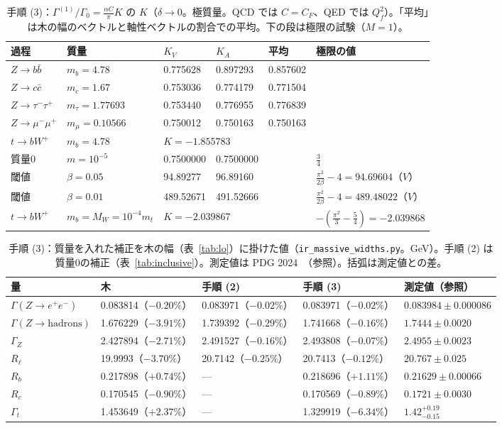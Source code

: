 \documentclass[a4paper,10pt]{ltjsarticle}
\begin{document}
\begin{table}[tbp]
\centering\small
\caption{手順 (3)：$\Gamma^{(1)}/\Gamma_0=\frac{\alpha C}\pi K$ の $K$（$\delta\to0$。極質量。QCD では $C=C_F$、QED では $Q_f^2$）。「平均」は木の幅のベクトルと軸性ベクトルの割合での平均。下の段は極限の試験（$M=1$）。}
\label{tab:massive}
\begin{tabular}{llllll}
\toprule
過程 & 質量 & $K_V$ & $K_A$ & 平均 & 極限の値 \\
\midrule
$Z\to b\bar b$ & $m_b=4.78$ & 0.775628 & 0.897293 & 0.857602 & \\
$Z\to c\bar c$ & $m_c=1.67$ & 0.753036 & 0.774179 & 0.771504 & \\
$Z\to\tau^-\tau^+$ & $m_\tau=1.77693$ & 0.753440 & 0.776955 & 0.776839 & \\
$Z\to\mu^-\mu^+$ & $m_\mu=0.10566$ & 0.750012 & 0.750163 & 0.750163 & \\
$t\to bW^+$ & $m_b=4.78$ & \multicolumn{3}{l}{$K=-1.855783$} & \\
\midrule
質量0 & $m=10^{-5}$ & 0.7500000 & 0.7500000 & & $\frac34$ \\
閾値 & $\beta=0.05$ & 94.89277 & 96.89160 & & $\frac{\pi^2}{2\beta}-4=94.69604$（$V$） \\
閾値 & $\beta=0.01$ & 489.52671 & 491.52666 & & $\frac{\pi^2}{2\beta}-4=489.48022$（$V$） \\
$t\to bW^+$ & $m_b=M_W=10^{-4}m_t$ & \multicolumn{3}{l}{$K=-2.039867$} & $-(\frac{\pi^2}3-\frac54)=-2.039868$ \\
\bottomrule
\end{tabular}
\end{table}

\begin{table}[tbp]
\centering\small
\caption{手順 (3)：質量を入れた補正を木の幅（表~\ref{tab:lo}）に掛けた値（\texttt{ir\_massive\_widths.py}。GeV）。手順 (2) は質量0の補正（表~\ref{tab:inclusive}）。測定値は PDG 2024~\cite{pdg24}（参照）。括弧は測定値との差。}
\label{tab:massivewidths}
\begin{tabular}{lllll}
\toprule
量 & 木 & 手順 (2) & 手順 (3) & 測定値（参照） \\
\midrule
$\Gamma(Z\to e^+e^-)$ & 0.083814（$-0.20\%$） & 0.083971（$-0.02\%$） & 0.083971（$-0.02\%$） & $0.083984\pm0.000086$ \\
$\Gamma(Z\to\mathrm{hadrons})$ & 1.676229（$-3.91\%$） & 1.739392（$-0.29\%$） & 1.741668（$-0.16\%$） & $1.7444\pm0.0020$ \\
$\Gamma_Z$ & 2.427894（$-2.71\%$） & 2.491527（$-0.16\%$） & 2.493808（$-0.07\%$） & $2.4955\pm0.0023$ \\
$R_\ell$ & 19.9993（$-3.70\%$） & 20.7142（$-0.25\%$） & 20.7413（$-0.12\%$） & $20.767\pm0.025$ \\
$R_b$ & 0.217898（$+0.74\%$） & — & 0.218696（$+1.11\%$） & $0.21629\pm0.00066$ \\
$R_c$ & 0.170545（$-0.90\%$） & — & 0.170569（$-0.89\%$） & $0.1721\pm0.0030$ \\
$\Gamma_t$ & 1.453649（$+2.37\%$） & — & 1.329919（$-6.34\%$） & $1.42^{+0.19}_{-0.15}$ \\
\bottomrule
\end{tabular}
\end{table}
\end{document}
